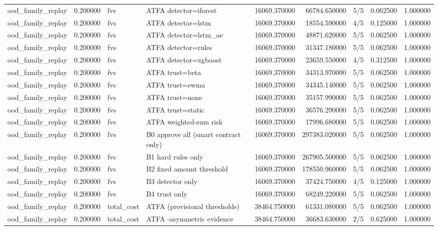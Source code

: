 \begin{tabular}{lrllrrlrr}
ood\_family\_replay & 0.200000 & fvs & ATFA detector=iforest & 16069.370000 & 66784.650000 & 5/5 & 0.062500 & 1.000000 \\
ood\_family\_replay & 0.200000 & fvs & ATFA detector=lstm & 16069.370000 & 18554.590000 & 4/5 & 0.125000 & 1.000000 \\
ood\_family\_replay & 0.200000 & fvs & ATFA detector=lstm\_ae & 16069.370000 & 48871.620000 & 5/5 & 0.062500 & 1.000000 \\
ood\_family\_replay & 0.200000 & fvs & ATFA detector=rules & 16069.370000 & 31347.180000 & 5/5 & 0.062500 & 1.000000 \\
ood\_family\_replay & 0.200000 & fvs & ATFA detector=xgboost & 16069.370000 & 23659.550000 & 4/5 & 0.312500 & 1.000000 \\
ood\_family\_replay & 0.200000 & fvs & ATFA trust=beta & 16069.370000 & 34313.970000 & 5/5 & 0.062500 & 1.000000 \\
ood\_family\_replay & 0.200000 & fvs & ATFA trust=ewma & 16069.370000 & 34345.140000 & 5/5 & 0.062500 & 1.000000 \\
ood\_family\_replay & 0.200000 & fvs & ATFA trust=none & 16069.370000 & 35157.990000 & 5/5 & 0.062500 & 1.000000 \\
ood\_family\_replay & 0.200000 & fvs & ATFA trust=static & 16069.370000 & 36576.290000 & 5/5 & 0.062500 & 1.000000 \\
ood\_family\_replay & 0.200000 & fvs & ATFA weighted-sum risk & 16069.370000 & 17996.680000 & 5/5 & 0.062500 & 1.000000 \\
ood\_family\_replay & 0.200000 & fvs & B0 approve all (smart contract only) & 16069.370000 & 297383.020000 & 5/5 & 0.062500 & 1.000000 \\
ood\_family\_replay & 0.200000 & fvs & B1 hard rules only & 16069.370000 & 267905.500000 & 5/5 & 0.062500 & 1.000000 \\
ood\_family\_replay & 0.200000 & fvs & B2 fixed amount threshold & 16069.370000 & 178550.960000 & 5/5 & 0.062500 & 1.000000 \\
ood\_family\_replay & 0.200000 & fvs & B3 detector only & 16069.370000 & 37424.750000 & 4/5 & 0.125000 & 1.000000 \\
ood\_family\_replay & 0.200000 & fvs & B4 trust only & 16069.370000 & 68249.220000 & 5/5 & 0.062500 & 1.000000 \\
ood\_family\_replay & 0.200000 & total\_cost & ATFA (provisional thresholds) & 38464.750000 & 61331.080000 & 5/5 & 0.062500 & 1.000000 \\
ood\_family\_replay & 0.200000 & total\_cost & ATFA -asymmetric evidence & 38464.750000 & 36683.630000 & 2/5 & 0.625000 & 1.000000 \\

\end{tabular}
